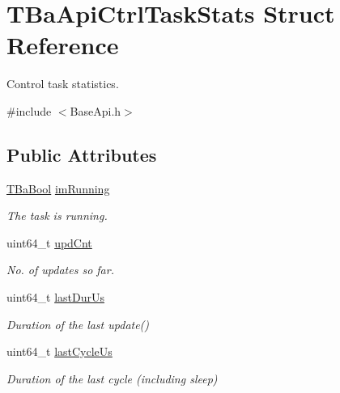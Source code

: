 \hypertarget{structTBaApiCtrlTaskStats}{}\section{T\+Ba\+Api\+Ctrl\+Task\+Stats Struct Reference}
\label{structTBaApiCtrlTaskStats}


Control task statistics.  




{\ttfamily \#include $<$Base\+Api.\+h$>$}

\subsection*{Public Attributes}
\begin{DoxyCompactItemize}
\item 
\hyperlink{BaBool_8h_a5fe1eb8d6ba045ac2251a8f369c2e7b6}{T\+Ba\+Bool} \hyperlink{structTBaApiCtrlTaskStats_a5991a4b35aec43477fee7d8634268e5e}{im\+Running}\hypertarget{structTBaApiCtrlTaskStats_a5991a4b35aec43477fee7d8634268e5e}{}\label{structTBaApiCtrlTaskStats_a5991a4b35aec43477fee7d8634268e5e}

\begin{DoxyCompactList}\small\item\em The task is running. \end{DoxyCompactList}\item 
uint64\+\_\+t \hyperlink{structTBaApiCtrlTaskStats_a2d2fd92a156a13e4370b0780af633b4e}{upd\+Cnt}\hypertarget{structTBaApiCtrlTaskStats_a2d2fd92a156a13e4370b0780af633b4e}{}\label{structTBaApiCtrlTaskStats_a2d2fd92a156a13e4370b0780af633b4e}

\begin{DoxyCompactList}\small\item\em No. of updates so far. \end{DoxyCompactList}\item 
uint64\+\_\+t \hyperlink{structTBaApiCtrlTaskStats_ad7f03c51dc4304d96c3a4800cdfe32ce}{last\+Dur\+Us}\hypertarget{structTBaApiCtrlTaskStats_ad7f03c51dc4304d96c3a4800cdfe32ce}{}\label{structTBaApiCtrlTaskStats_ad7f03c51dc4304d96c3a4800cdfe32ce}

\begin{DoxyCompactList}\small\item\em Duration of the last {\ttfamily update()} \end{DoxyCompactList}\item 
uint64\+\_\+t \hyperlink{structTBaApiCtrlTaskStats_af283fbcd6b2606313931d905a4b44f2a}{last\+Cycle\+Us}\hypertarget{structTBaApiCtrlTaskStats_af283fbcd6b2606313931d905a4b44f2a}{}\label{structTBaApiCtrlTaskStats_af283fbcd6b2606313931d905a4b44f2a}

\begin{DoxyCompactList}\small\item\em Duration of the last cycle (including sleep) \end{DoxyCompactList}\end{DoxyCompactItemize}


